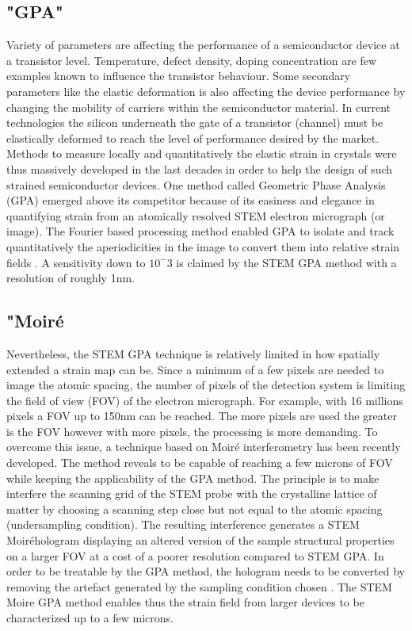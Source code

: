 \documentclass{article}
\begin{document}
\subsection{"GPA"}
Variety of parameters are affecting the performance of a semiconductor device at a transistor level. Temperature, defect density, doping concentration are few examples known to influence the transistor behaviour. Some secondary parameters like the elastic deformation is also affecting the device performance by changing the mobility of carriers within the semiconductor material. In current technologies the silicon underneath the gate of a transistor (channel) must be elastically deformed to reach the level of performance desired by the market. Methods to measure locally and quantitatively the elastic strain in crystals were thus massively developed in the last decades in order to help the design of such strained semiconductor devices. One method called Geometric Phase Analysis (GPA) emerged above its competitor because of its easiness and elegance in quantifying strain from an atomically resolved STEM electron micrograph (or image). The Fourier based processing method enabled GPA to isolate and track quantitatively the aperiodicities in the image to convert them into relative strain fields \cite{Hytch1998}. A sensitivity down to $10^-3$ is claimed by the STEM GPA method with a resolution of roughly 1nm.
\subsection{"Moir{\'e}}
Nevertheless, the STEM GPA technique is relatively limited in how spatially extended a strain map can be. Since a minimum of a few pixels are needed to image the atomic spacing, the number of pixels of the detection system is limiting the field of view (FOV) of the electron micrograph. For example, with 16 millions pixels a FOV up to 150nm can be reached. The more pixels are used the greater is the FOV however with more pixels, the processing is more demanding. To overcome this issue, a technique based on Moir{\'e} interferometry has been recently developed. The method reveals to be capable of reaching a few microns of FOV while keeping the applicability of the GPA method. The principle is to make interfere the scanning grid of the STEM probe with the crystalline lattice of matter by choosing a scanning step close but not equal to the atomic spacing (undersampling condition). The resulting interference generates a STEM Moir{\'e}hologram displaying an altered version of the sample structural properties on a larger FOV at a cost of a poorer resolution compared to STEM GPA. In order to be treatable by the GPA method, the hologram needs to be converted by removing the artefact generated by the sampling condition chosen \cite{Pofelski2017}. The STEM Moire GPA method enables thus the strain field from larger devices to be characterized up to a few microns.
\end{document}
